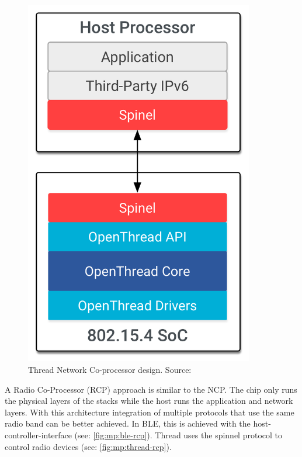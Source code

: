 \begin{figure}
    \centering
    \includegraphics[width=100mm, keepaspectratio]{figures/ot-arch-ncp-vert_2x.png}
    \caption{Thread Network Co-processor design. Source: \cite{thread:platforms}}
    \label{fig:mp:thread-ncp}
\end{figure}

A Radio Co-Processor (RCP) approach is similar to the NCP. The chip only runs the physical layers of the stacks while the host runs the application and network layers. With this architecture integration of multiple protocols that use the same radio band can be better achieved. In BLE, this is achieved with the host-controller-interface (see: \autoref{fig:mp:ble-rcp}). Thread uses the spinnel protocol to control radio devices (see: \autoref{fig:mp:thread-rcp}).

